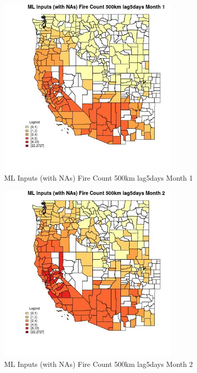 \begin{figure} 
\centering  
\includegraphics[width=0.77\textwidth]{Code_Outputs/Report_ML_input_PM25_Step4_part_f_de_duplicated_aves_prioritize_24hr_obswNAs_CountyFire_Count_500km_lag5daysmedianMonth1.jpg} 
\caption{\label{fig:Report_ML_input_PM25_Step4_part_f_de_duplicated_aves_prioritize_24hr_obswNAsCountyFire_Count_500km_lag5daysmedianMonth1}ML Inputs (with NAs) Fire Count 500km lag5days Month 1} 
\end{figure} 
 

\begin{figure} 
\centering  
\includegraphics[width=0.77\textwidth]{Code_Outputs/Report_ML_input_PM25_Step4_part_f_de_duplicated_aves_prioritize_24hr_obswNAs_CountyFire_Count_500km_lag5daysmedianMonth2.jpg} 
\caption{\label{fig:Report_ML_input_PM25_Step4_part_f_de_duplicated_aves_prioritize_24hr_obswNAsCountyFire_Count_500km_lag5daysmedianMonth2}ML Inputs (with NAs) Fire Count 500km lag5days Month 2} 
\end{figure} 
 

